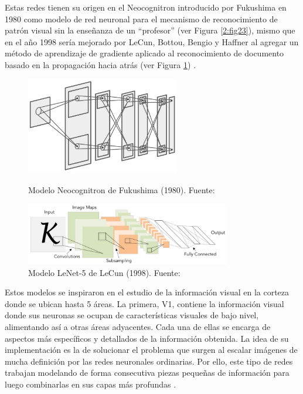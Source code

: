 \begin{itemize}
\begin{itemize}
		Estas redes tienen su origen en el Neocognitron introducido por Fukushima en 1980 como modelo de red neuronal para el mecanismo de reconocimiento de patrón visual sin la enseñanza de un “profesor” (ver Figura \ref{2:fig23}), mismo que en el año 1998 sería mejorado por LeCun, Bottou, Bengio y Haffner al agregar un método de aprendizaje de gradiente aplicado al reconocimiento de documento basado en la propagación hacia atrás (ver Figura \ref{2:fig24}) \parencite{tec_li2019cnn}.
		\begin{figure}[htbp]
			\begin{center}
				\includegraphics[width=0.6\textwidth]{2/figures/neocognitron.jpg}
				\caption{Modelo Neocognitron de Fukushima (1980). Fuente: \cite{tec_li2019cnn}}
				\label{2:fig23}
				
				\includegraphics[width=0.8\textwidth]{2/figures/lenet5.jpg}
				\caption{Modelo LeNet-5 de LeCun (1998). Fuente: \cite{tec_li2019cnn}}
				\label{2:fig24}
			\end{center}
		\end{figure}
		
		Estos modelos se inspiraron en el estudio de la información visual en la corteza donde se ubican hasta 5 áreas. La primera, V1, contiene la información visual donde sus neuronas se ocupan de características visuales de bajo nivel, alimentando así a otras áreas adyacentes. Cada una de ellas se encarga de aspectos más específicos y detallados de la información obtenida. La idea de su implementación es la de solucionar el problema que surgen al escalar imágenes de mucha definición por las redes neuronales ordinarias. Por ello, este tipo de redes trabajan modelando de forma consecutiva piezas pequeñas de información para luego combinarlas en sus capas más profundas \parencite{tec_lopez2016cnnTF}.
		

\end{itemize}
\end{itemize}
